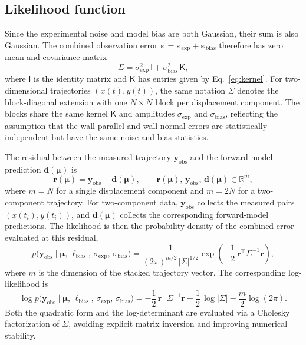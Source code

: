 \documentclass{elsarticle}
\renewcommand{\vec}[1]{\boldsymbol{#1}}
\newcommand{\mat}[1]{\mathsf{#1}}
\newcommand{\params}{\boldsymbol{\mu}}
\begin{document}
\subsection{Likelihood function}
\label{subsec:likelihood}

Since the experimental noise and model bias are both Gaussian, their sum
is also Gaussian. The combined observation error
$\vec{\varepsilon} = \vec{\varepsilon}_{\mathrm{exp}}
                   + \vec{\varepsilon}_{\mathrm{bias}}$
therefore has zero mean and covariance matrix
\begin{equation}
\mat{\Sigma}
= \sigma_{\mathrm{exp}}^{2}\,\mat{I}
+ \sigma_{\mathrm{bias}}^{2}\,\mat{K},
\label{eq:covariance}
\end{equation}
where $\mat{I}$ is the identity matrix and $\mat{K}$ has entries given
by Eq.~\eqref{eq:kernel}. For two-dimensional trajectories
$(x(t),y(t))$, the same notation $\mat{\Sigma}$ denotes the
block-diagonal extension with one $N\times N$ block per displacement
component. The blocks share the same kernel $\mat{K}$ and amplitudes
$\sigma_{\mathrm{exp}}$ and $\sigma_{\mathrm{bias}}$, reflecting the
assumption that the wall-parallel and wall-normal errors are
statistically independent but have the same noise and bias statistics.

The residual between the measured trajectory $\vec{y}_{\mathrm{obs}}$
and the forward-model prediction $\vec{d}(\params)$ is
\begin{equation}
\vec{r}(\params)
= \vec{y}_{\mathrm{obs}} - \vec{d}(\params),
\qquad
\vec{r}(\params),\,\vec{y}_{\mathrm{obs}},\,\vec{d}(\params)
\in \mathbb{R}^{m},
\label{eq:residual}
\end{equation}
where $m=N$ for a single displacement component and $m=2N$ for a
two-component trajectory. For two-component data, $\vec{y}_{\mathrm{obs}}$
collects the measured pairs $(x(t_i),y(t_i))$, and $\vec{d}(\params)$
collects the corresponding forward-model predictions. The likelihood is
then the probability density of the combined error evaluated at this
residual,
\begin{equation}
p\bigl(\vec{y}_{\mathrm{obs}}
       \mid \params,\, \ell_{\mathrm{bias}},\,\sigma_{\mathrm{exp}},\,\sigma_{\mathrm{bias}}\bigr)
= \dfrac{1}{(2\pi)^{m/2}\,|\mat{\Sigma}|^{1/2}}
  \exp\!\left(
  -\dfrac{1}{2}\,\vec{r}^{\top}\mat{\Sigma}^{-1}\vec{r}
  \right),
\label{eq:likelihood}
\end{equation}
where $m$ is the dimension of the stacked trajectory vector. The
corresponding log-likelihood is
\begin{equation}
\log p\bigl(\vec{y}_{\mathrm{obs}}
            \mid \params,\,\ell_{\mathrm{bias}},\,\sigma_{\mathrm{exp}},\,\sigma_{\mathrm{bias}}\bigr)
= -\dfrac{1}{2}\,\vec{r}^{\top}\mat{\Sigma}^{-1}\vec{r}
  -\dfrac{1}{2}\,\log|\mat{\Sigma}|
  -\dfrac{m}{2}\log(2\pi).
\label{eq:loglikelihood}
\end{equation}
Both the quadratic form and the log-determinant are evaluated via a
Cholesky factorization of $\mat{\Sigma}$, avoiding explicit matrix
inversion and improving numerical stability.
\end{document}
